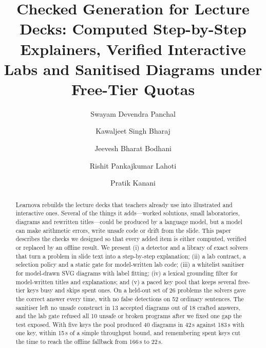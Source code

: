 \documentclass[runningheads]{llncs}
\begin{document}
\title{Checked Generation for Lecture Decks: Computed Step-by-Step Explainers, Verified Interactive Labs and Sanitised Diagrams under Free-Tier Quotas}

\author{Swayam Devendra Panchal \and Kawaljeet Singh Bharaj \and Jeevesh Bharat Bodhani \and
Rishit Pankajkumar Lahoti \and Pratik Kanani}

\maketitle

\begin{abstract}
Learnova rebuilds the lecture decks that teachers already use into illustrated and interactive ones. Several of the things it
adds---worked solutions, small laboratories, diagrams and rewritten titles---could be produced by a language model, but a model
can make arithmetic errors, write unsafe code or drift from the slide. This paper describes the checks we designed so that
every added item is either computed, verified or replaced by an offline result. We present (i) a detector and a library of
exact solvers that turn a problem in slide text into a step-by-step explanation; (ii) a lab contract, a selection policy and a
static gate for model-written lab code; (iii) a whitelist sanitiser for model-drawn SVG diagrams with label fitting;
(iv) a lexical grounding filter for model-written titles and explanations; and (v) a paced key pool that keeps several
free-tier keys busy and skips spent ones. On a held-out set of 26 problems the solvers gave the correct answer every time,
with no false detections on 52 ordinary sentences. The sanitiser left no unsafe construct in 13 accepted diagrams out of 18
crafted answers, and the lab gate refused all 10 unsafe or broken programs after we fixed one gap the test exposed. With five
keys the pool produced 40 diagrams in 42\,s against 183\,s with one key, within 15\,s of a simple throughput bound, and
remembering spent keys cut the time to reach the offline fallback from 166\,s to 22\,s.
\end{abstract}
\end{document}
